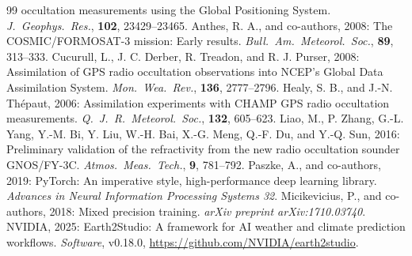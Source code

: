 \documentclass[twocolumn,11pt]{article}
\begin{document}
\begin{thebibliography}{99}
occultation measurements using the Global Positioning System.
\emph{J.\ Geophys.\ Res.}, \textbf{102}, 23429--23465.
Anthes, R. A., and co-authors, 2008: The COSMIC/FORMOSAT-3 mission:
Early results. \emph{Bull.\ Am.\ Meteorol.\ Soc.}, \textbf{89},
313--333.
Cucurull, L., J. C. Derber, R. Treadon, and R. J. Purser, 2008:
Assimilation of GPS radio occultation observations into NCEP's
Global Data Assimilation System. \emph{Mon.\ Wea.\ Rev.},
\textbf{136}, 2777--2796.
Healy, S. B., and J.-N. Th\'epaut, 2006: Assimilation experiments
with CHAMP GPS radio occultation measurements. \emph{Q.\ J.\ R.\
Meteorol.\ Soc.}, \textbf{132}, 605--623.
Liao, M., P. Zhang, G.-L. Yang, Y.-M. Bi, Y. Liu, W.-H. Bai,
X.-G. Meng, Q.-F. Du, and Y.-Q. Sun, 2016: Preliminary validation of
the refractivity from the new radio occultation sounder GNOS/FY-3C.
\emph{Atmos.\ Meas.\ Tech.}, \textbf{9}, 781--792.
Paszke, A., and co-authors, 2019: PyTorch: An imperative style,
high-performance deep learning library. \emph{Advances in Neural
Information Processing Systems 32}.
Micikevicius, P., and co-authors, 2018: Mixed precision training.
\emph{arXiv preprint arXiv:1710.03740}.
NVIDIA, 2025: Earth2Studio: A framework for AI weather and climate
prediction workflows. \emph{Software}, v0.18.0,
\url{https://github.com/NVIDIA/earth2studio}.

\end{thebibliography}
\end{document}
